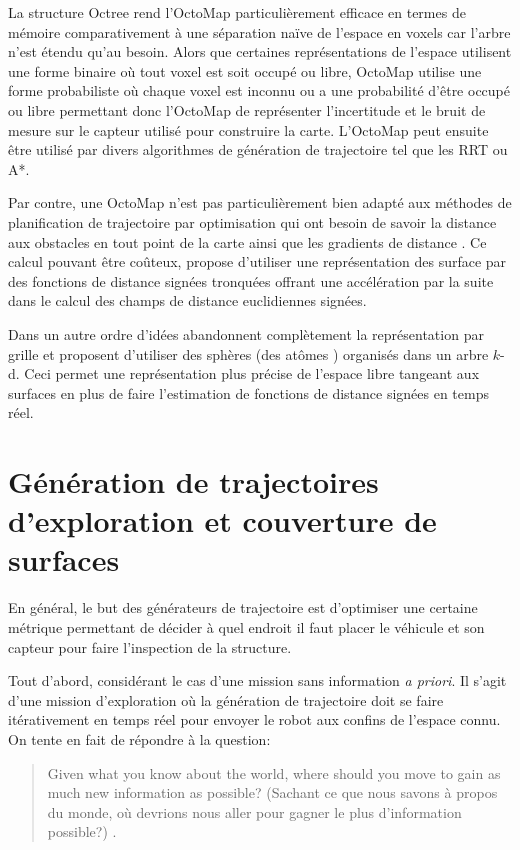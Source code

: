 La structure Octree rend l'OctoMap particulièrement efficace en termes de mémoire comparativement à une séparation naïve de l'espace en voxels car l'arbre n'est étendu qu'au besoin. Alors que certaines représentations de l'espace utilisent une forme binaire où tout voxel est soit occupé ou libre, OctoMap utilise une forme probabiliste où chaque voxel est inconnu ou a une probabilité d'être occupé ou libre permettant donc l'OctoMap de représenter l'incertitude et le bruit de mesure sur le capteur utilisé pour construire la carte. L'OctoMap peut ensuite être utilisé par divers algorithmes de génération de trajectoire tel que les RRT ou A*.

Par contre, une OctoMap n'est pas particulièrement bien adapté aux méthodes de planification de trajectoire par optimisation qui ont besoin de savoir la distance aux obstacles en tout point de la carte ainsi que les gradients de distance \citep{ratliff2009chomp, Oleynikova2016}. Ce calcul pouvant être coûteux, \cite{oleynikova2017voxblox} propose d'utiliser une représentation des surface par des fonctions de distance signées tronquées offrant une accélération par la suite dans le calcul des champs de distance euclidiennes signées.

Dans un autre ordre d'idées \cite{Fridovich-Keil2017AtomMap} abandonnent complètement la représentation par grille et proposent d'utiliser des sphères (des \guillemotleft atômes \guillemotright) organisés dans un arbre $k$-d. Ceci permet une représentation plus précise de l'espace libre tangeant aux surfaces en plus de faire l'estimation de fonctions de distance signées en temps réel.

\section{Génération de trajectoires d'exploration et couverture de surfaces}\label{subsec:generation}

En général, le but des générateurs de trajectoire est d'optimiser une certaine métrique permettant de décider à quel endroit il faut placer le véhicule et son capteur pour faire l'inspection de la structure.

Tout d'abord, considérant le cas d'une mission sans information \textit{a priori}. Il s'agit d'une mission d'exploration où la génération de trajectoire doit se faire itérativement en temps réel pour envoyer le robot aux confins de l'espace connu. On tente en fait de répondre à la question:

\begin{quote}
  Given what you know about the world, where should you move to gain as much new information as possible? (Sachant ce que nous savons à propos du monde, où devrions nous aller pour gagner le plus d'information possible?) \citep{Yamauchi1997}.
\end{quote}

